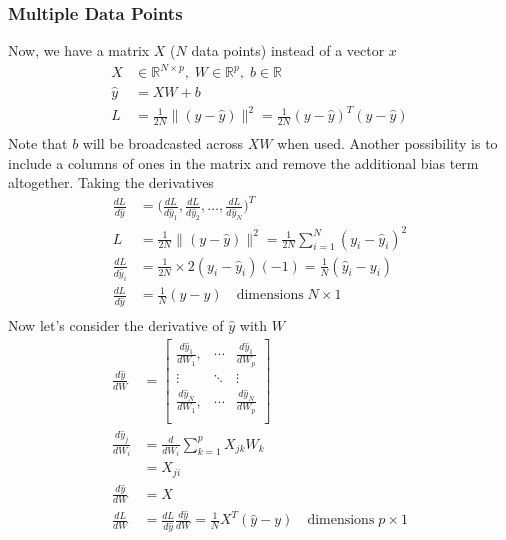 \documentclass[../../deep_learning_notes.tex]{subfiles}
\begin{document}
\subsubsection*{Multiple Data Points}
Now, we have a matrix $X$ ($N$ data points) instead of a vector $x$
\begin{align*}
    X &\in \mathbb{R}^{N \times p}, \; W \in \mathbb{R}^{p}, \; b \in \mathbb{R}\\
    \hat{y} &= XW + b\\
    L &= \frac{1}{2N}\lVert (y - \hat{y}) \rVert^{2}
    = \frac{1}{2N}(y - \hat{y})^{T}(y - \hat{y})\\
\end{align*}
Note that $b$ will be broadcasted across $XW$ when used. Another possibility is to include a columns of ones in the matrix and remove the additional bias term altogether. Taking the derivatives
\begin{align*}
    \frac{dL}{d\hat{y}} &= \big( \frac{dL}{d\hat{y}_1}, \frac{dL}{d\hat{y}_2}, \ldots, \frac{dL}{d\hat{y}_N} \big)^{T}\\
    L &= \frac{1}{2N}\lVert (y - \hat{y}) \rVert^{2} = \frac{1}{2N} \sum_{i=1}^{N} (y_{i} - \hat{y}_{i})^{2}\\
    \frac{dL}{d\hat{y}_{i}} &= \frac{1}{2N} \times 2(y_{i} - \hat{y}_{i})(-1)
    = \frac{1}{N}(\hat{y}_{i} - y_{i})\\
    \frac{dL}{d\hat{y}} &= \frac{1}{N}(\hat{y} - y) \quad \text{dimensions}\; N \times 1\\
\end{align*}
Now let's consider the derivative of $\hat{y}$ with $W$
\begin{align*}
    \frac{d\hat{y}}{dW} &= \begin{bmatrix}
        \frac{d\hat{y}_{1}}{dW_{1}}, &\cdots &\frac{d\hat{y}_{1}}{dW_{p}}\\
        \vdots &\ddots &\vdots\\
        \frac{d\hat{y}_{N}}{dW_{1}}, &\cdots &\frac{d\hat{y}_{N}}{dW_{p}}\\
    \end{bmatrix}\\
    \frac{d\hat{y}_{j}}{dW_{i}} &= \frac{d}{dW_{i}}\sum_{k=1}^{p}X_{jk}W_{k}\\
    &= X_{ji}\\
    \frac{d\hat{y}}{dW} &= X\\
    \frac{dL}{dW} &= \frac{dL}{d\hat{y}} \frac{d\hat{y}}{dW}
    = \frac{1}{N}X^{T}(\hat{y} - y) \quad \text{dimensions}\; p \times 1\\
\end{align*}
\end{document}
